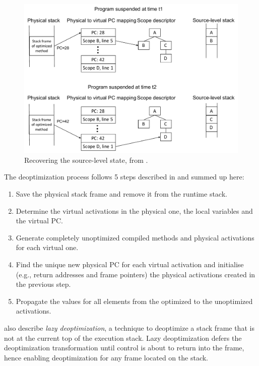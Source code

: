 \begin{figure}[h]
\centering
\includegraphics[scale=0.5]{Figures/Figure2.pdf}
\decoRule
\caption[Recovering the source-level state]{Recovering the source-level state, from \cite{holzle1992debugging}.}
\label{Holzle2}
\end{figure}


The deoptimization process follows 5 steps described in \cite{holzle1992debugging} and summed up here:
\begin{enumerate}
    \item Save the physical stack frame and remove it from the runtime stack.
    \item Determine the virtual activations in the physical one, the local variables and the virtual PC.
    \item Generate completely unoptimized compiled methods and physical activations for each virtual one.
    \item Find the unique new physical PC for each virtual activation and initialise (e.g., return addresses and frame pointers) the physical activations created in the previous step.
    \item Propagate the values for all elements from the optimized to the unoptimized activations.
\end{enumerate}

 also describe \textit{lazy deoptimization}, a technique to deoptimize a stack frame that is not at the current top of the execution stack. 
Lazy deoptimization defers the deoptimization transformation until control is about to return into the frame, hence enabling deoptimization for any frame located on the stack.\\

